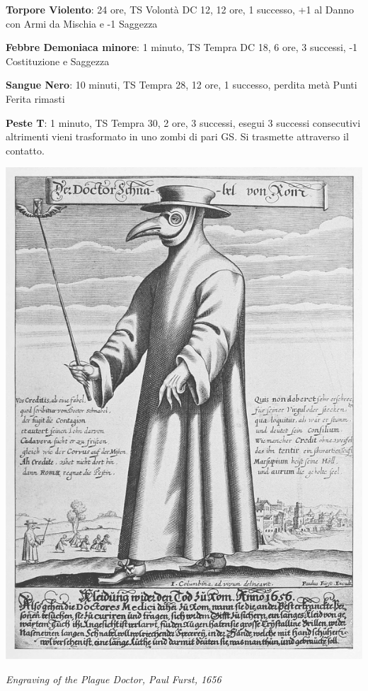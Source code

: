 \begin{multicols}{2}
\textbf{Torpore Violento}: 24 ore, TS Volontà DC 12, 12 ore, 1 successo, +1 al Danno con Armi da Mischia e -1 Saggezza

\textbf{Febbre Demoniaca minore}: 1 minuto, TS Tempra DC 18, 6 ore, 3 successi, -1 Costituzione e Saggezza

\textbf{Sangue Nero}: 10 minuti, TS Tempra 28, 12 ore, 1 successo, perdita metà Punti Ferita rimasti

\textbf{Peste T}: 1 minuto, TS Tempra 30, 2 ore, 3 successi, esegui 3 successi consecutivi altrimenti vieni trasformato in uno zombi di pari GS. Si trasmette attraverso il contatto.

\end{multicols}

\vfill




\begin{center}
\includegraphics[width=0.6\linewidth]{immagini/plaguedoctor.png}

\emph{Engraving of the Plague Doctor, Paul Furst, 1656}
\end{center}


\pagebreak


